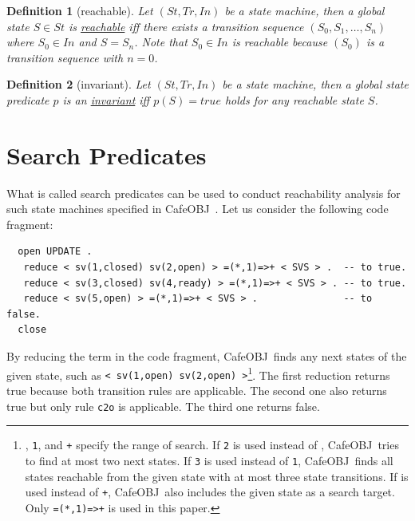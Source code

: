 \documentclass[12pt]{report}
\newtheorem{definition}{Definition}
\newcommand{\stt}[1]{{\small{\tt {#1}}}}
\newcommand{\ul}{\underline}
\newcommand{\cafeobj}{{\sf CafeOBJ}~}
\begin{document}
\begin{definition}[reachable]
  Let $(St,Tr,In)$ be a state machine, then a global state $S\in St$
  is \ul{reachable} iff there exists a transition sequence
  $(S_0,S_1,\dots,S_n)$ where $S_0\in In$ and $S=S_n$. Note that $S_0\in
  In$ is reachable because $(S_0)$ is a transition sequence with $n=0$.
\end{definition}
\begin{definition}[invariant]
  Let $(St,Tr,In)$ be a state machine, then a global state predicate
  $p$ is an \ul{invariant} iff $p(S)=true$ holds for any reachable
  state $S$.
\end{definition}

\section{Search Predicates}
\label{sec:searchpredicate}
What is called search predicates can be used to conduct
reachability analysis for such state machines specified in
\cafeobj. Let us consider the following code fragment:
\begin{verbatim}
  open UPDATE .
   reduce < sv(1,closed) sv(2,open) > =(*,1)=>+ < SVS > .  -- to true.
   reduce < sv(3,closed) sv(4,ready) > =(*,1)=>+ < SVS > . -- to true.
   reduce < sv(5,open) > =(*,1)=>+ < SVS > .               -- to false.
  close
\end{verbatim}
By reducing the term in the code fragment, \cafeobj finds any next
states of the given state, such as
\stt{<~sv(1,open)~sv(2,open)~>}\footnote{{\tt *}, {\tt 1}, and {\tt +}
  specify the range of search. If {\tt 2} is used instead of {\tt *},
  \cafeobj tries to find at most two next states. If {\tt 3} is used
  instead of {\tt 1}, \cafeobj finds all states reachable from the
  given state with at most three state transitions. If {\tt *} is used
  instead of {\tt +}, \cafeobj also includes the given state as a
  search target.  Only \stt{=(*,1)=>+} is used in this paper.}.  The
first reduction returns true because both transition rules are
applicable.  The second one also returns true but only rule {\tt c2o}
is applicable. The third one returns false.
\end{document}
